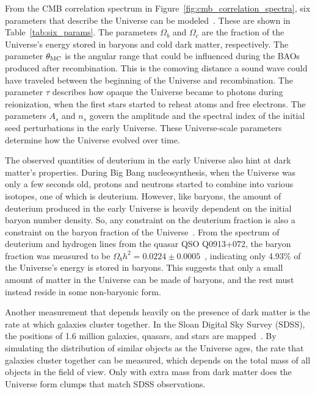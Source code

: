 From the CMB correlation spectrum in Figure~\ref{fig:cmb_correlation_spectra}, six parameters that describe the Universe can be modeled~\cite{planck_dm_limit,planck_2013_parameters}.
These are shown in Table~\ref{tab:six_params}.
The parameters $\Omega_b$ and $\Omega_c$ are the fraction of the Universe's energy stored in baryons and cold dark matter, respectively.
The parameter $\theta_{\textrm{MC}}$ is the angular range that could be influenced during the BAOs produced after recombination.
This is the comoving distance a sound wave could have traveled between the beginning of the Universe and recombination.
The parameter $\tau$ describes how opaque the Universe became to photons during reionization, when the first stars started to reheat atoms and free electrons.
The parameters $A_s$ and $n_s$ govern the amplitude and the spectral index of the initial seed perturbations in the early Universe.
These Universe-scale parameters determine how the Universe evolved over time.

The observed quantities of deuterium in the early Universe also hint at dark matter's properties.
During Big Bang nucleosynthesis, when the Universe was only a few seconds old, protons and neutrons started to combine into various isotopes, one of which is deuterium.
However, like baryons, the amount of deuterium produced in the early Universe is heavily dependent on the initial baryon number density.
So, any constraint on the deuterium fraction is also a constraint on the baryon fraction of the Universe~\cite{deuterium1,deuterium2}.
From the spectrum of deuterium and hydrogen lines from the quasar QSO Q0913+072, the baryon fraction was measured to be $\Omega_{b}h^2 = 0.0224 \pm 0.0005$~\cite{deuterium3}, indicating only 4.93\% of the Universe's energy is stored in baryons.
This suggests that only a small amount of matter in the Universe can be made of baryons, and the rest must instead reside in some non-baryonic form.

Another measurement that depends heavily on the presence of dark matter is the rate at which galaxies cluster together.
In the Sloan Digital Sky Survey (SDSS), the positions of 1.6 million galaxies, quasars, and stars are mapped~\cite{sdss_release}.
By simulating the distribution of similar objects as the Universe ages, the rate that galaxies cluster together can be measured, which depends on the total mass of all objects in the field of view.
Only with extra mass from dark matter does the Universe form clumps that match SDSS observations.

